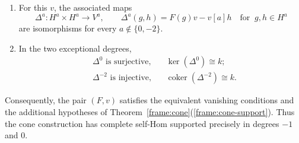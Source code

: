\documentclass[11pt]{article}
\begin{document}
\begin{Prop}
\begin{enumerate}
\item\label{frame:factory-nonexceptional}
For this $v$, the associated maps
\begin{equation*}
\Delta^a: H^a\times H^a\longrightarrow V^a,
\qquad\Delta^a(g,h)=F(g)v-v[a]h \quad\mbox{for}\;\; g, h\in H^a
\end{equation*}
are isomorphisms for every $a\notin\{0,-2\}$.

\item\label{frame:factory-exceptions}
In the two exceptional degrees,
\[
\begin{aligned}
 &\Delta^0\text{ is surjective},
 &&\ker(\Delta^0)\cong k;\\
 &\Delta^{-2}\text{ is injective},
 &&\operatorname{coker}(\Delta^{-2})\cong k.
\end{aligned}
\]
\end{enumerate}
Consequently, the pair $(F,v)$ satisfies the equivalent vanishing
conditions and the additional hypotheses of
Theorem~\ref{frame:cone}\textup{(\ref{frame:cone-support})}.
Thus the cone construction has complete self-Hom supported
precisely in degrees $-1$ and $0$.
\end{Prop}
\end{document}

